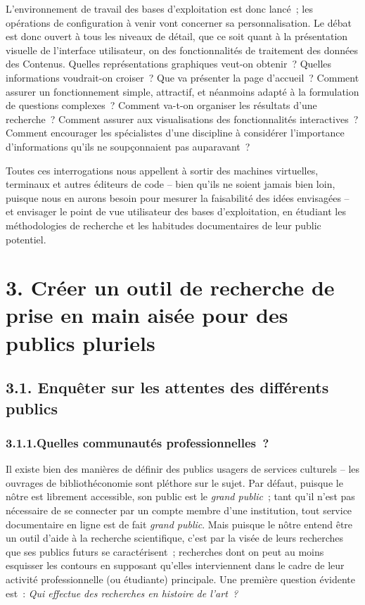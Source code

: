 \documentclass[a4paper,12pt, twoside]{book}
\begin{document}
L’environnement de travail des bases d’exploitation est donc lancé~; les opérations de configuration à venir vont concerner sa personnalisation. Le débat est donc ouvert à tous les niveaux de détail, que ce soit quant à la présentation visuelle de l’interface utilisateur, on des fonctionnalités de traitement des données des Contenus. Quelles représentations graphiques veut-on obtenir~? Quelles informations voudrait-on croiser~? Que va présenter la page d’accueil~? Comment assurer un fonctionnement simple, attractif, et néanmoins adapté à la formulation de questions complexes~? Comment va-t-on organiser les résultats d’une recherche~? Comment assurer aux visualisations des fonctionnalités interactives~? Comment encourager les spécialistes d’une discipline à considérer l’importance d’informations qu’ils ne soupçonnaient pas auparavant~?

Toutes ces interrogations nous appellent à sortir des machines virtuelles, terminaux et autres éditeurs de code -- bien qu’ils ne soient jamais bien loin, puisque nous en aurons besoin pour mesurer la faisabilité des idées envisagées -- et envisager le point de vue utilisateur des bases d’exploitation, en étudiant les méthodologies de recherche et les habitudes documentaires de leur public potentiel.

\clearemptydoublepage
\chapter*{3. Créer un outil de recherche de prise en main aisée pour des publics pluriels}

\section*{3.1. Enquêter sur les attentes des différents publics}

\subsection*{3.1.1.Quelles communautés professionnelles~?}

Il existe bien des manières de définir des publics usagers de services culturels -- les ouvrages de bibliothéconomie sont pléthore sur le sujet. Par défaut, puisque le nôtre est librement accessible, son public est le \textit{grand public}~; tant qu’il n’est pas nécessaire de se connecter par un compte membre d’une institution, tout service documentaire en ligne est de fait \textit{grand public}. Mais puisque le nôtre entend être un outil d’aide à la recherche scientifique, c’est par la visée de leurs recherches que ses publics futurs se caractérisent~; recherches dont on peut au moins esquisser les contours en supposant qu’elles interviennent dans le cadre de leur activité professionnelle (ou étudiante) principale. Une première question évidente est~: \textit{Qui effectue des recherches en histoire de l’art~?}
\end{document}
